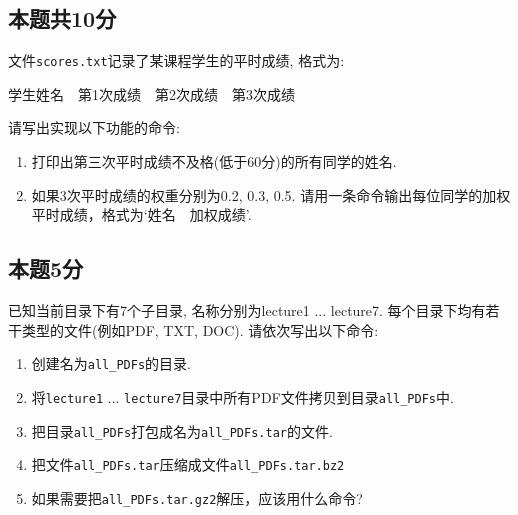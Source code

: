 \documentclass[a4paper,11pt]{article}
\begin{document}
\begin{CJK*}{UTF8}{gbsn}
\subsection{本题共10分}
文件\verb|scores.txt|记录了某课程学生的平时成绩, 格式为: 

学生姓名\ \ 第1次成绩\ \  第2次成绩\ \ 第3次成绩

\noindent 请写出实现以下功能的命令:
\begin{enumerate}
\item 打印出第三次平时成绩不及格(低于60分)的所有同学的姓名.
\item 如果3次平时成绩的权重分别为0.2, 0.3, 0.5. 请用一条命令输出每位同学的加权平时成绩，格式为`姓名\ \ 加权成绩'.
\end{enumerate}

\subsection{本题5分}
已知当前目录下有7个子目录, 名称分别为lecture1 ... lecture7. 每个目录下均有若干类型的文件(例如PDF, TXT, DOC).
请依次写出以下命令:
\begin{enumerate}
\item 创建名为\verb|all_PDFs|的目录.
\item 将\verb|lecture1| ... \verb|lecture7|目录中所有PDF文件拷贝到目录\verb|all_PDFs|中.
\item 把目录\verb|all_PDFs|打包成名为\verb|all_PDFs.tar|的文件.
\item 把文件\verb|all_PDFs.tar|压缩成文件\verb|all_PDFs.tar.bz2|
\item 如果需要把\verb|all_PDFs.tar.gz2|解压，应该用什么命令?
\end{enumerate}

\end{CJK*}
\end{document}
